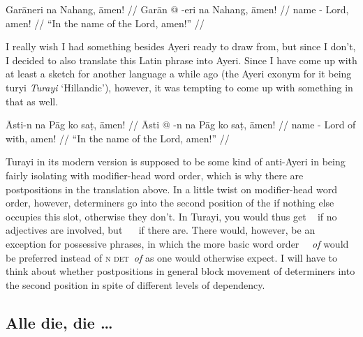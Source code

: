 \documentclass[12pt,paper=a4]{scrartcl}
\newcommand{\xayr}[3]{{\Tagati #1} \emph{#2} \enquote*{#3}}
\begin{document}

\ex \label{ex:innomine}
\begingl
	\glpreamble Garāneri na Nahang, āmen! //
	\gla Garān @ -eri na Nahang, āmen! //
	\glb name -\Ins{} \Gen{} Lord, amen! //
	\glft \enquote{In the name of the Lord, amen!} //
\endgl \xe

I really wish I had something besides Ayeri ready to draw from, but 
since I don't, I decided to also translate this Latin phrase into Ayeri.
Since I have come up with at least a sketch for another language a while ago 
(the Ayeri exonym for it being \xayr{turyi}{Turayi}{Hillandic}), however, it was 
tempting to come up with something in that as well.

\ex[exno=\ref{ex:innomine}.1] \begingl
	\glpreamble {} Āsti-n na Pāg 
		ko saț, āmen! //
	\gla Āsti @ -n na Pāg ko saț, āmen! //
	\glb name -\Def{} \Def{} Lord of with, amen! //
	\glft \enquote{In the name of the Lord, amen!} //
\endgl
\xe

Turayi in its modern version is supposed to be some kind of anti-Ayeri in being 
fairly isolating with modifier-head word order, which is why there are 
postpositions in the translation above. In a little twist on modifier-head
word order, however, determiners go into the second position of the \Np{} if 
nothing else occupies this slot, otherwise they don't. In Turayi, you would thus 
get \Noun{}~\Det{} if no adjectives are involved, but \Adj{}~\Det{}~\Noun{} if 
there are. There would, however, be an exception for possessive phrases, in 
which the more basic word order \Det{}~\Noun{}~\emph{of} would be preferred 
instead of \textsc{n det}~\emph{of} as one would otherwise expect. I will have 
to think about whether postpositions in general block movement of determiners 
into the second position in spite of different levels of dependency.

\subsection*{Alle die, die …}

\end{document}

